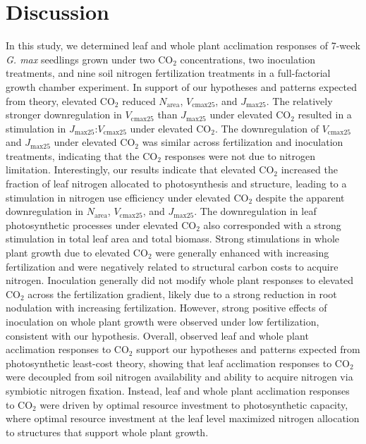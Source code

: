 \section{Discussion}
In this study, we determined leaf and whole plant acclimation responses of 7-week \textit{G. max} seedlings grown under two CO$_2$ concentrations, two inoculation treatments, and nine soil nitrogen fertilization treatments in a full-factorial growth chamber experiment. In support of our hypotheses and patterns expected from theory, elevated CO$_2$ reduced $N_\mathrm{area}$, $V_\mathrm{cmax25}$, and $J_\mathrm{max25}$. The relatively stronger downregulation in $V_\mathrm{cmax25}$ than $J_\mathrm{max25}$ under elevated CO$_2$ resulted in a stimulation in $J_\mathrm{max25}$:$V_\mathrm{cmax25}$ under elevated CO$_2$. The downregulation of $V_\mathrm{cmax25}$ and $J_\mathrm{max25}$ under elevated CO$_2$ was similar across fertilization and inoculation treatments, indicating that the CO$_2$ responses were not due to nitrogen limitation. Interestingly, our results indicate that elevated CO$_2$ increased the fraction of leaf nitrogen allocated to photosynthesis and structure, leading to a stimulation in nitrogen use efficiency under elevated CO$_2$ despite the apparent downregulation in $N_\mathrm{area}$, $V_\mathrm{cmax25}$, and $J_\mathrm{max25}$. The downregulation in leaf photosynthetic processes under elevated CO$_2$ also corresponded with a strong stimulation in total leaf area and total biomass. Strong stimulations in whole plant growth due to elevated CO$_2$ were generally enhanced with increasing fertilization and were negatively related to structural carbon costs to acquire nitrogen. Inoculation generally did not modify whole plant responses to elevated CO$_2$ across the fertilization gradient, likely due to a strong reduction in root nodulation with increasing fertilization. However, strong positive effects of inoculation on whole plant growth were observed under low fertilization, consistent with our hypothesis. Overall, observed leaf and whole plant acclimation responses to CO$_2$ support our hypotheses and patterns expected from photosynthetic least-cost theory, showing that leaf acclimation responses to CO$_2$ were decoupled from soil nitrogen availability and ability to acquire nitrogen via symbiotic nitrogen fixation. Instead, leaf and whole plant acclimation responses to CO$_2$ were driven by optimal resource investment to photosynthetic capacity, where optimal resource investment at the leaf level maximized nitrogen allocation to structures that support whole plant growth.

